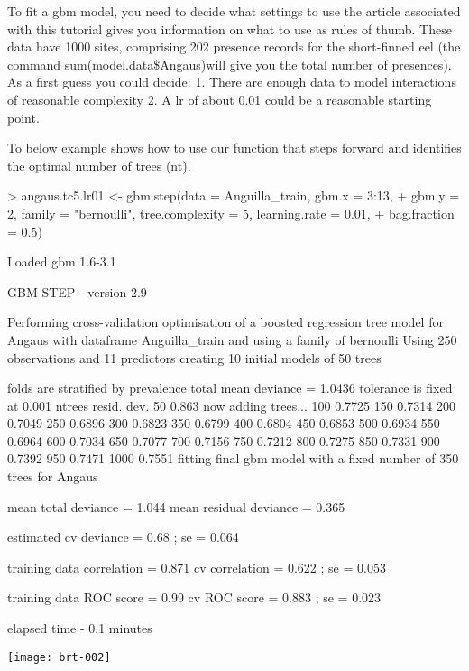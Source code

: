 \documentclass{article}
\begin{document}
To fit a gbm model, you need to decide what settings to use the article associated with this tutorial gives you information on what to use as rules of thumb. These data have 1000 sites, comprising 202 presence records for the short-finned eel (the command sum(model.data\$Angaus)will give you the total number of presences). As a first guess you could decide:
1. There are enough data to model interactions of reasonable complexity 
2. A lr of about 0.01 could be a reasonable starting point. 

To below example shows how to use our function that steps forward and identifies the optimal number of trees (nt).

\begin{Schunk}
\begin{Sinput}
> angaus.tc5.lr01 <- gbm.step(data = Anguilla_train, gbm.x = 3:13, 
+     gbm.y = 2, family = "bernoulli", tree.complexity = 5, learning.rate = 0.01, 
+     bag.fraction = 0.5)
\end{Sinput}
\begin{Soutput}
Loaded gbm 1.6-3.1 

 
 GBM STEP - version 2.9 
 
Performing cross-validation optimisation of a boosted regression tree model 
for Angaus with dataframe Anguilla_train and using a family of bernoulli 
Using 250 observations and 11 predictors 
creating 10 initial models of 50 trees 

 folds are stratified by prevalence 
total mean deviance =  1.0436 
tolerance is fixed at  0.001 
ntrees resid. dev. 
50    0.863 
now adding trees... 
100   0.7725 
150   0.7314 
200   0.7049 
250   0.6896 
300   0.6823 
350   0.6799 
400   0.6804 
450   0.6853 
500   0.6934 
550   0.6964 
600   0.7034 
650   0.7077 
700   0.7156 
750   0.7212 
800   0.7275 
850   0.7331 
900   0.7392 
950   0.7471 
1000   0.7551 
fitting final gbm model with a fixed number of  350  trees for  Angaus 

mean total deviance = 1.044 
mean residual deviance = 0.365 
 
estimated cv deviance = 0.68 ; se = 0.064 
 
training data correlation = 0.871 
cv correlation =  0.622 ; se = 0.053 
 
training data ROC score = 0.99 
cv ROC score = 0.883 ; se = 0.023 
 
elapsed time -  0.1 minutes 
\end{Soutput}
\end{Schunk}
\texttt{[image: brt-002]}
\end{document}

